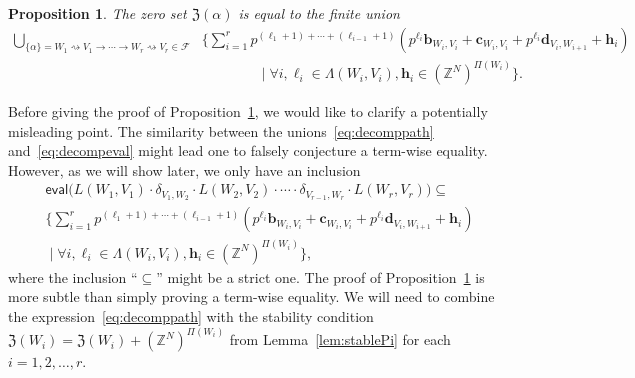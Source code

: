 \documentclass[letterpaper, 11pt, thm-restate]{article}
\numberwithin{equation}{section}
\newcommand{\Z}{\mathbb{Z}}
\newcommand{\mF}{\mathcal{F}}
\newcommand{\mZ}{\mathfrak{Z}}
\newcommand{\bb}{\boldsymbol{b}}
\newcommand{\bc}{\boldsymbol{c}}
\newcommand{\bd}{\boldsymbol{d}}
\newcommand{\bh}{\boldsymbol{h}}
\newcommand{\eval}{\mathsf{eval}}
\newtheorem{prop}[thrm]{Proposition}
\theoremstyle{definition}
\theoremstyle{definition}
\theoremstyle{definition}
\begin{document}
\begin{prop}\label{prop:protosuccinct}
    The zero set $\mZ(\alpha)$ is equal to the finite union
    \begin{align}\label{eq:decompeval}
        \bigcup_{\{\alpha\} = W_1 \rightsquigarrow V_1 \rightarrow \cdots \rightarrow W_r \rightsquigarrow V_r \in \mF} & \Bigg\{\sum_{i = 1}^r p^{(\ell_1 + 1) + \cdots + (\ell_{i-1} + 1)} \left(p^{\ell_i} \bb_{W_i, V_i} + \bc_{W_i, V_i} + p^{\ell_i} \bd_{V_i, W_{i+1}} + \bh_i \right) \nonumber \\
        & \qquad \qquad \;\Bigg|\; \forall i, \ell_i \in \Lambda(W_i, V_i), \bh_i \in (\Z^N)^{\Pi(W_i)} \Bigg\}.
    \end{align}
\end{prop}
Before giving the proof of Proposition~\ref{prop:protosuccinct}, we would like to clarify a potentially misleading point.
The similarity between the unions~\eqref{eq:decomppath} and~\eqref{eq:decompeval} might lead one to falsely conjecture a term-wise equality.
However, as we will show later, we only have an inclusion
\begin{multline*}
    \eval\Big(L(W_1, V_1) \cdot \delta_{V_1, W_2} \cdot L(W_2, V_2) \cdot \cdots \cdot \delta_{V_{r-1}, W_r} \cdot L(W_r, V_r)\Big) \subseteq \\
    \Bigg\{\sum_{i = 1}^r p^{(\ell_1 + 1) + \cdots + (\ell_{i-1} + 1)} \left(p^{\ell_i} \bb_{W_i, V_i} + \bc_{W_i, V_i} + p^{\ell_i} \bd_{V_i, W_{i+1}} + \bh_i \right) \\
    \;\Bigg|\; \forall i, \ell_i \in \Lambda(W_i, V_i), \bh_i \in (\Z^N)^{\Pi(W_i)} \Bigg\},
\end{multline*}
where the inclusion ``$\subseteq$'' might be a strict one.
The proof of Proposition~\ref{prop:protosuccinct} is more subtle than simply proving a term-wise equality.
We will need to combine the expression~\eqref{eq:decomppath} with the stability condition $\mZ(W_i) = \mZ(W_i) + (\Z^N)^{\Pi(W_i)}$ from Lemma~\ref{lem:stablePi} for each $i = 1, 2, \ldots, r$.
\end{document}
